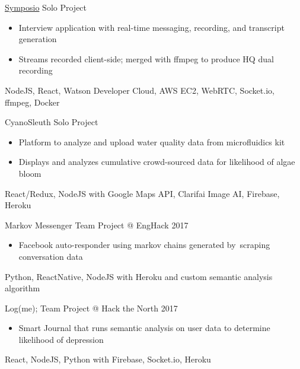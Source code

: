\documentclass[]{friggeri-cv}
\begin{document}
\begin{entrylist}
	\entry
	{\href{https://symposio.stream}{Symposio\textsuperscript{\faExternalLink}}  \href{https://github.com/suzyng83209/symposio}{\textcolor{red}{\faGithub}}}
	{\vspace{0.5\parsep}Solo Project}
	{
		\begin{itemize}[leftmargin=*]\itemsep0.1cm
			\vspace{-0.4cm}
			\item {Interview application} with real-time messaging, recording, and transcript generation \ 
			\item Streams recorded client-side; {merged with ffmpeg} to produce HQ dual recording
		\end{itemize}
		\vspace{0.1cm}NodeJS, React, Watson Developer Cloud, AWS EC2, WebRTC, Socket.io, ffmpeg, Docker
	}
	\entry
	{CyanoSleuth \href{https://github.com/suzyng83209/cyanosleuth}{\textcolor{red}{\faGithub}}}
	{\vspace{0.5\parsep}Solo Project}
	{
		\begin{itemize}[leftmargin=*]\itemsep0.1cm
			\vspace{-0.4cm}
			\item {Platform to analyze and upload} water quality data from microfluidics kit
			\item Displays and analyzes cumulative crowd-sourced data for likelihood of algae bloom
		\end{itemize}
		\vspace{0.1cm}React/Redux, NodeJS with Google Maps API, Clarifai Image AI, Firebase, Heroku
	}
	\entry
	{Markov Messenger  \href{https://github.com/suzyng83209/markov-messenger-bot}{\textcolor{red}{\faGithub}}}
	{\vspace{0.5\parsep}Team Project @ EngHack 2017}
	{
		\begin{itemize}[leftmargin=*]\itemsep0.1cm
			\vspace{-0.4cm}
			\item Facebook auto-responder using {markov chains} generated by\ {scraping conversation data}
		\end{itemize}
		\vspace{0.1cm}Python, ReactNative, NodeJS with Heroku and custom semantic analysis algorithm
	}
	\entry
	{Log(me);  \href{https://github.com/suzyng83209/htn2017}{\textcolor{red}{\faGithub}}}
	{\vspace{0.5\parsep}Team Project @ Hack the North 2017}
	{
		\begin{itemize}[leftmargin=*]\itemsep0.1cm
			\vspace{-0.4cm}
			\item Smart Journal that runs {semantic analysis on user data} to determine likelihood of depression
		\end{itemize}
		\vspace{0.1cm}React, NodeJS, Python with Firebase, Socket.io, Heroku
	}
\end{entrylist}
\end{document}

